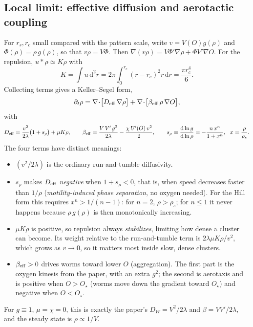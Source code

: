\documentclass[11pt,a4paper]{article}
\newcommand{\dd}{\mathrm{d}}
\newcommand{\Ostar}{O_{\star}}
\begin{document}
\subsection{Local limit: effective diffusion and aerotactic coupling}
For $r_s,r_c$ small compared with the pattern scale, write $v=V(O)g(\rho)$ and $\Phi(\rho)=\rho\,g(\rho)$, so that $v\rho=V\Phi$. Then $\nabla(v\rho)=V\Phi'\nabla\rho+\Phi V'\nabla O$. For the repulsion, $u*\rho\simeq K\rho$ with
\begin{equation}
K=\int u\,\dd^2r=2\pi\int_0^{r_c}(r-r_c)^2r\,\dd r=\frac{\pi r_c^4}{6}.
\end{equation}
Collecting terms gives a Keller--Segel form,
\begin{equation}
\partial_t\rho=\nabla\!\cdot\!\big[D_{\rm eff}\,\nabla\rho\big]+\nabla\!\cdot\!\big[\beta_{\rm eff}\,\rho\,\nabla O\big],
\label{eq:KS}
\end{equation}
with
\begin{equation}
D_{\rm eff}=\frac{v^2}{2\lambda}\big(1+s_\rho\big)+\mu K\rho,
\qquad
\beta_{\rm eff}=\frac{V\,V'\,g^2}{2\lambda}-\frac{\chi\,U'(O)\,v^2}{2},
\qquad
s_\rho\equiv\frac{\dd\ln g}{\dd\ln\rho}=-\frac{n\,x^{n}}{1+x^{n}},\ \ x=\frac{\rho}{\rho_s}.
\label{eq:Dbeta}
\end{equation}
The four terms have distinct meanings:
\begin{itemize}
\item $(v^2/2\lambda)$ is the ordinary run-and-tumble diffusivity.
\item $s_\rho$ makes $D_{\rm eff}$ \emph{negative} when $1+s_\rho<0$, that is, when speed decreases faster than $1/\rho$ (\emph{motility-induced phase separation}, no oxygen needed). For the Hill form this requires $x^n>1/(n-1)$: for $n=2$, $\rho>\rho_s$; for $n\le1$ it never happens because $\rho\,g(\rho)$ is then monotonically increasing.
\item $\mu K\rho$ is positive, so repulsion always \emph{stabilizes}, limiting how dense a cluster can become. Its weight relative to the run-and-tumble term is $2\lambda\mu K\rho/v^2$, which grows as $v\to0$, so it matters most inside slow, dense clusters.
\item $\beta_{\rm eff}>0$ drives worms toward lower $O$ (aggregation). The first part is the oxygen kinesis from the paper, with an extra $g^2$; the second is aerotaxis and is positive when $O>\Ostar$ (worms move down the gradient toward $\Ostar$) and negative when $O<\Ostar$.
\end{itemize}
For $g\equiv1$, $\mu=\chi=0$, this is exactly the paper's $D_W=V^2/2\lambda$ and $\beta=VV'/2\lambda$, and the steady state is $\rho\propto1/V$.
\end{document}

